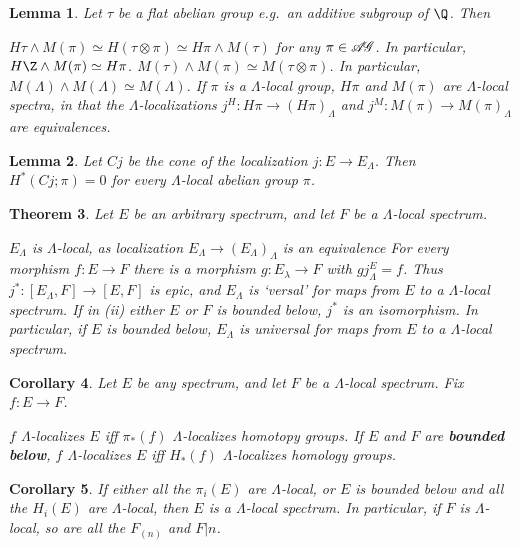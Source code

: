\documentclass[11pt]{article}
\theoremstyle{plain}
\newtheorem{thm}{Theorem}[subsection]
\newtheorem{lem}[thm]{Lemma}
\newtheorem{cor}[thm]{Corollary}
\theoremstyle{definition}
\newcommand{\AG}{\scrA\!\scrG}
\begin{document}
{\begin{lem}Let $\tau$ be a flat abelian group \lparen e.g.\ an additive subgroup
of $\Q$\rparen. Then\upcol
\begin{itemise}
\itm[(i)]$H\tau\wedge M(\pi)\simeq H(\tau\otimes\pi)\simeq H\pi\wedge M(\tau)$
for any $\pi\in\AG$. In particular, $H\Z\wedge M(\pi)\simeq H\pi$.
\itm[(ii)] $M(\tau)\wedge M(\pi)\simeq M(\tau\otimes\pi)$. In particular,
$M(\Lambda)\wedge M(\Lambda)\simeq M(\Lambda)$.
\itm[(iii)] If $\pi$ is a $\Lambda$-local group, $H\pi$ and $M(\pi)$ are
$\Lambda$-local spectra, in that the $\Lambda$-localizations $j^H:H\pi\to
(H\pi)_\Lambda$ and $j^M:M(\pi)\to M(\pi)_\Lambda$ are equivalences.
\end{itemise}
\end{lem}
\begin{lem}
Let $Cj$ be the cone of the localization $j:E\to E_\Lambda$. Then
$H^*(Cj;\pi)=0$ for every $\Lambda$-local abelian group $\pi$.
\end{lem}
\begin{thm}Let $E$ be an arbitrary spectrum, and let $F$ be a $\Lambda$-local
spectrum.
\begin{itemise}
\itm[(i)]$E_\Lambda$ is $\Lambda$-local, as localization
$E_\Lambda\to(E_\Lambda)_\Lambda$ is an equivalence
\itm[(ii)] For every morphism $f:E\to F$ there is a morphism $g:E_\lambda\to F$
with $gj_\Lambda^E=f$. Thus $j^*:[E_\Lambda,F]\to[E,F]$ is epic, and $E_\Lambda$
is `versal' for maps from $E$ to a $\Lambda$-local spectrum.
\itm[(iii)] If in (ii) either $E$ or $F$ is bounded below, $j^*$ is an
isomorphism. In particular, if $E$ is bounded below, $E_\Lambda$ is universal
for maps from $E$ to a $\Lambda$-local spectrum.
\end{itemise}
\end{thm}
\begin{cor}Let $E$ be any spectrum, and let $F$ be a $\Lambda$-local spectrum.
Fix $f:E\to F$.
\begin{itemise}
\itm[(i)]$f$ $\Lambda$-localizes $E$ iff $\pi_*(f)$ $\Lambda$-localizes homotopy
groups.
\itm[(ii)]If $E$ and $F$ are \textbf{bounded below}, $f$ $\Lambda$-localizes $E$
iff $H_*(f)$ $\Lambda$-localizes homology groups.
\end{itemise}
\end{cor}
\begin{cor}
If either all the $\pi_i(E)$ are $\Lambda$-local, or $E$ is bounded below and
all the $H_i(E)$ are $\Lambda$-local, then $E$ is a $\Lambda$-local spectrum. In
particular, if $F$ is $\Lambda$-local, so are all the $F_{(n)}$ and $F|n$.

\end{cor}}
\end{document}
